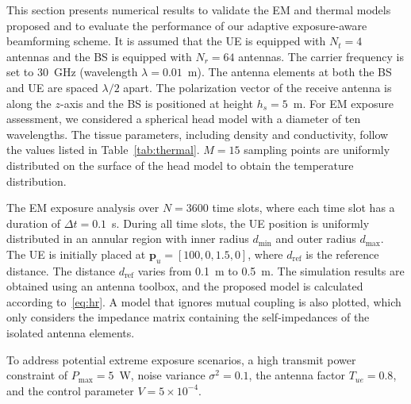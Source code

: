 \documentclass[journal]{IEEEtran}
\begin{document}
This section presents numerical results to validate the EM and thermal models proposed and to evaluate the performance of our adaptive exposure-aware beamforming scheme. It is assumed that the UE is equipped with $N_t = 4$ antennas and the BS is equipped with $N_r = 64$ antennas. The carrier frequency is set to 30~GHz (wavelength $\lambda = 0.01$~m). The antenna elements at both the BS and UE are spaced $\lambda/2$ apart. The polarization vector of the receive antenna is along the $z$-axis and the BS is positioned at height $h_s = 5$~m. For EM exposure assessment, we considered a spherical head model with a diameter of ten wavelengths. The tissue parameters, including density and conductivity, follow the values listed in Table~\ref{tab:thermal}. $M = 15$ sampling points are uniformly distributed on the surface of the head model to obtain the temperature distribution.

The EM exposure analysis over $N = 3600$ time slots, where each time slot has a duration of $\Delta t = 0.1$~s. During all time slots, the UE position is uniformly distributed in an annular region with inner radius $d_{\min}$ and outer radius $d_{\max}$. The UE is initially placed at $\mathbf{p}_u = [100, 0, 1.5, 0]$, where $d_{\mathrm{ref}}$ is the reference distance. The distance $d_{\mathrm{ref}}$ varies from 0.1~m to 0.5~m. The simulation results are obtained using an antenna toolbox, and the proposed model is calculated according to~\eqref{eq:hr}. A model that ignores mutual coupling is also plotted, which only considers the impedance matrix containing the self-impedances of the isolated antenna elements.

To address potential extreme exposure scenarios, a high transmit power constraint of $P_{\max} = 5$~W, noise variance $\sigma^2 = 0.1$, the antenna factor $T_{ue} = 0.8$, and the control parameter $V = 5 \times 10^{-4}$.
\end{document}
